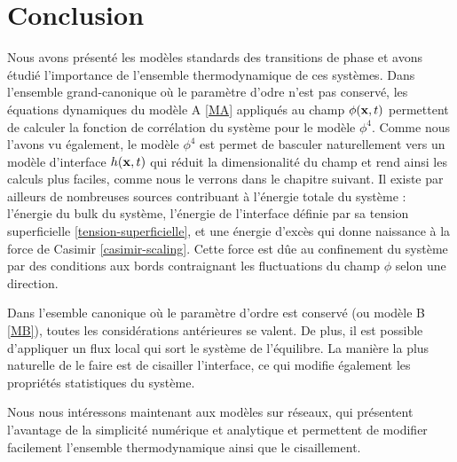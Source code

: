 \section{Conclusion}

Nous avons présenté les modèles standards des transitions de phase et avons étudié l'importance de l'ensemble thermodynamique de ces systèmes. Dans l'ensemble grand-canonique où le paramètre d'odre n'est pas conservé, les équations dynamiques du modèle A \ref{MA} appliqués au champ $\phi({\bf x},t)$ permettent de calculer la fonction de corrélation du système pour le modèle $\phi^4$. Comme nous l'avons vu également, le modèle $\phi^4$ est permet de basculer naturellement vers un modèle d'interface $h({\bf x},t)$ qui réduit la dimensionalité du champ et rend ainsi les calculs plus faciles, comme nous le verrons dans le chapitre suivant. 
Il existe par ailleurs de nombreuses sources contribuant à l'énergie totale du système : l'énergie du bulk du système, l'énergie de l'interface définie par sa tension superficielle \ref{tension-superficielle}, et une énergie d'excès qui donne naissance à la force de Casimir \ref{casimir-scaling}. Cette force est dûe au confinement du système par des conditions aux bords contraignant les fluctuations du champ $\phi$ selon une direction. 

Dans l'esemble canonique où le paramètre d'ordre est conservé (ou modèle B \ref{MB}),  toutes les considérations antérieures se valent. De plus, il est possible d'appliquer un flux local qui sort le système de l'équilibre. La manière la plus naturelle de le faire est de cisailler l'interface, ce qui modifie également les propriétés statistiques du système. 

Nous nous intéressons maintenant aux modèles sur réseaux, qui présentent l'avantage de la simplicité numérique et analytique et permettent de modifier facilement l'ensemble thermodynamique ainsi que le cisaillement. 